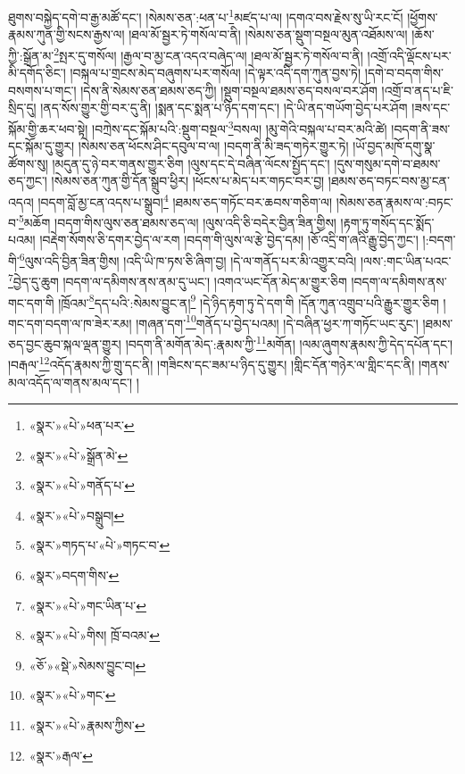 ཐུགས་བསྐྱེད་དགེ་བ་རྒྱ་མཚོ་དང་། །སེམས་ཅན་:ཕན་པ་\footnote{«སྣར་»«པེ་»ཕན་པར་}མཛད་པ་ལ། །དགའ་བས་རྗེས་སུ་ཡི་རང་ངོ། །ཕྱོགས་རྣམས་ཀུན་གྱི་སངས་རྒྱས་ལ། །ཐལ་མོ་སྦྱར་ཏེ་གསོལ་བ་ནི། །སེམས་ཅན་སྡུག་བསྔལ་མུན་འཐོམས་ལ། །ཆོས་ཀྱི་:སྒྲོན་མ་\footnote{«སྣར་»«པེ་»སྒྲོན་མེ་}སྤར་དུ་གསོལ། །རྒྱལ་བ་མྱ་ངན་འདའ་བཞེད་ལ། །ཐལ་མོ་སྦྱར་ཏེ་གསོལ་བ་ནི། །འགྲོ་འདི་ལྡོངས་པར་མི་དགོད་ཅིང་། །བསྐལ་པ་གྲངས་མེད་བཞུགས་པར་གསོལ། །དེ་ལྟར་འདི་དག་ཀུན་བྱས་ཏེ། །དགེ་བ་བདག་གིས་བསགས་པ་གང་། །དེས་ནི་སེམས་ཅན་ཐམས་ཅད་ཀྱི། །སྡུག་བསྔལ་ཐམས་ཅད་བསལ་བར་ཤོག །འགྲོ་བ་ནད་པ་ཇི་སྲིད་དུ། །ནད་སོས་གྱུར་གྱི་བར་དུ་ནི། །སྨན་དང་སྨན་པ་ཉིད་དག་དང་། །དེ་ཡི་ནད་གཡོག་བྱེད་པར་ཤོག །ཟས་དང་སྐོམ་གྱི་ཆར་ཕབ་སྟེ། །བཀྲེས་དང་སྐོམ་པའི་:སྡུག་བསྔལ་\footnote{«སྣར་»«པེ་»གནོད་པ་}བསལ། །མུ་གེའི་བསྐལ་པ་བར་མའི་ཚེ། །བདག་ནི་ཟས་དང་སྐོམ་དུ་གྱུར། །སེམས་ཅན་ཕོངས་ཤིང་དབུལ་བ་ལ། །བདག་ནི་མི་ཟད་གཏེར་གྱུར་ཏེ། །ཡོ་བྱད་མཁོ་དགུ་སྣ་ཚོགས་སུ། །མདུན་དུ་ཉེ་བར་གནས་གྱུར་ཅིག །ལུས་དང་དེ་བཞིན་ལོངས་སྤྱོད་དང་། །དུས་གསུམ་དགེ་བ་ཐམས་ཅད་ཀྱང་། །སེམས་ཅན་ཀུན་གྱི་དོན་སྒྲུབ་ཕྱིར། །ཕོངས་པ་མེད་པར་གཏང་བར་བྱ། །ཐམས་ཅད་བཏང་བས་མྱ་ངན་འདའ། །བདག་བློ་མྱ་ངན་འདས་པ་སྒྲུབ།\footnote{«སྣར་»«པེ་»བསྒྲུབ།} །ཐམས་ཅད་གཏོང་བར་ཆབས་གཅིག་ལ། །སེམས་ཅན་རྣམས་ལ་:བཏང་བ་\footnote{«སྣར་»གཏད་པ་«པེ་»གཏང་བ་}མཆོག །བདག་གིས་ལུས་ཅན་ཐམས་ཅད་ལ། །ལུས་འདི་ཅི་བདེར་བྱིན་ཟིན་གྱིས། །རྟག་ཏུ་གསོད་དང་སྨོད་པའམ། །བརྡེག་སོགས་ཅི་དགར་བྱེད་ལ་རག །བདག་གི་ལུས་ལ་རྩེ་བྱེད་དམ། །ཅོ་འདྲི་ག་ཞའི་རྒྱུ་བྱེད་ཀྱང་། །:བདག་གི་\footnote{«སྣར་»བདག་གིས་}ལུས་འདི་བྱིན་ཟིན་གྱིས། །འདི་ཡི་ཁ་ཏས་ཅི་ཞིག་བྱ། །དེ་ལ་གནོད་པར་མི་འགྱུར་བའི། །ལས་:གང་ཡིན་པའང་\footnote{«སྣར་»«པེ་»གང་ཡིན་པ་}བྱེད་དུ་ཆུག །བདག་ལ་དམིགས་ནས་ནམ་དུ་ཡང་། །འགའ་ཡང་དོན་མེད་མ་གྱུར་ཅིག །བདག་ལ་དམིགས་ནས་གང་དག་གི །ཁྲོའམ་\footnote{«སྣར་»«པེ་»གིས། ཁྲོ་བའམ་}དད་པའི་:སེམས་བྱུང་ན།\footnote{«ཅོ་»«སྡེ་»སེམས་བྱུང་བ།} །དེ་ཉིད་རྟག་ཏུ་དེ་དག་གི །དོན་ཀུན་འགྲུབ་པའི་རྒྱུར་གྱུར་ཅིག །གང་དག་བདག་ལ་ཁ་ཟེར་རམ། །གཞན་དག་\footnote{«སྣར་»«པེ་»གང་}གནོད་པ་བྱེད་པའམ། །དེ་བཞིན་ཕྱར་ཀ་གཏོང་ཡང་རུང་། །ཐམས་ཅད་བྱང་ཆུབ་སྐལ་ལྡན་གྱུར། །བདག་ནི་མགོན་མེད་:རྣམས་ཀྱི་\footnote{«སྣར་»«པེ་»རྣམས་ཀྱིས་}མགོན། །ལམ་ཞུགས་རྣམས་ཀྱི་དེད་དཔོན་དང་། །བརྒལ་\footnote{«སྣར་»རྒལ་}འདོད་རྣམས་ཀྱི་གྲུ་དང་ནི། །གཟིངས་དང་ཟམ་པ་ཉིད་དུ་གྱུར། །གླིང་དོན་གཉེར་ལ་གླིང་དང་ནི། །གནས་མལ་འདོད་ལ་གནས་མལ་དང་། །

